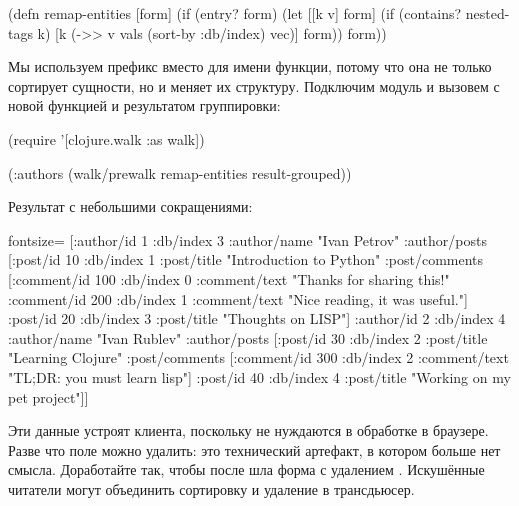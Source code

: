 \begin{english}
  \begin{clojure}
(defn remap-entities
  [form]
  (if (entry? form)
    (let [[k v] form]
      (if (contains? nested-tags k)
        [k (->> v vals (sort-by :db/index) vec)]
        form))
    form))
  \end{clojure}
\end{english}


Мы используем префикс  вместо  для имени функции, потому что она не только сортирует сущности, но и меняет их структуру. Подключим модуль  и вызовем  с новой функцией и результатом группировки:

\begin{english}
  \begin{clojure}
(require '[clojure.walk :as walk])

(:authors
 (walk/prewalk remap-entities result-grouped))
  \end{clojure}
\end{english}

Результат с небольшими сокращениями:

\begin{english}
  \begin{clojure*}{fontsize=\small}
[{:author/id 1
  :db/index 3
  :author/name "Ivan Petrov"
  :author/posts
  [{:post/id 10
    :db/index 1
    :post/title "Introduction to Python"
    :post/comments
    [{:comment/id 100
      :db/index 0
      :comment/text "Thanks for sharing this!"}
     {:comment/id 200
      :db/index 1
      :comment/text "Nice reading, it was useful."}]}
   {:post/id 20
    :db/index 3
    :post/title "Thoughts on LISP"}]}
 {:author/id 2
  :db/index 4
  :author/name "Ivan Rublev"
  :author/posts
  [{:post/id 30
    :db/index 2
    :post/title "Learning Clojure"
    :post/comments
    [{:comment/id 300
      :db/index 2
      :comment/text "TL;DR: you must learn lisp"}]}
   {:post/id 40
    :db/index 4
    :post/title "Working on my pet project"}]}]
  \end{clojure*}
\end{english}

Эти данные устроят клиента, поскольку не нуждаются в обработке в браузере. Разве что поле  можно удалить: это технический артефакт, в котором больше нет смысла. Доработайте  так, чтобы после  шла форма с удалением . Искушённые читатели могут объединить сортировку и удаление в трансдьюсер.

